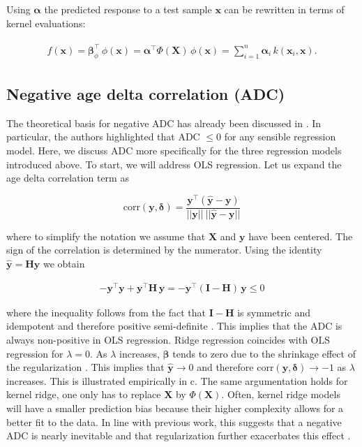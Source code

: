 \documentclass[utf8]{frontiersSCNS} %
\newcommand{\al}{\boldsymbol{\alpha}}
\renewcommand{\b}{\boldsymbol{\beta}} %
\newcommand{\corr}{\text{corr}}
\renewcommand{\d}{\boldsymbol{\delta}}
\renewcommand{\H}{\mathbf{H}}
\newcommand{\I}{\mathbf{I}}
\newcommand{\x}{\mathbf{x}}
\newcommand{\X}{\mathbf{X}}
\newcommand{\y}{\mathbf{y}}
\newcommand{\yh}{\mathbf{\hat{y}}}
\begin{document}
Using $\al$ the predicted response to a test sample $\x$ can be rewritten in terms of kernel evaluations:

\begin{align}
\begin{split}
\label{eq:kernel_ridge_apply}
f(\x) = \b_\phi^\top\, \phi(\x) = \al^\top\Phi(\X)\,\phi(\x) = \sum_{i=1}^n \al_i\, k(\x_i, \x).
\end{split}
\end{align}


\subsection{Negative age delta correlation (ADC)}\label{sec:ADC}

The theoretical basis for negative ADC has already been discussed in \cite{Le2018ABrainAGE}. In particular, the authors highlighted that ADC $\le 0$ for any sensible regression model. Here, we discuss ADC more specifically for the three regression models introduced above. To start, we will address OLS regression. Let us expand the age delta correlation term as

\begin{equation}\label{eq:correlation}
\corr(\y,\d) = \frac{\y^\top(\yh-\y)}{||\y||\ ||\yh-\y||} 
\end{equation}

where to simplify the notation we assume that $\X$ and $\y$ have been centered. The sign of the correlation is determined by the numerator. Using the identity $\yh = \H\y$ we obtain

\begin{equation}\label{eq:tmp}
\begin{split}
- \y^\top\y + \y^\top\H\,\y = -  \y^\top(\I-\H)\,\y\le 0
\end{split}
\end{equation}

where the inequality follows from the fact that  $\I-\H$ is symmetric and idempotent and therefore positive semi-definite \citep{Draper1966AppliedAnalysis}. This implies that the ADC is always non-positive in OLS regression.
Ridge regression coincides with OLS regression 
for $\lambda=0$. As  $\lambda$ increases, $\b$ tends to zero due to the shrinkage effect of the regularization \citep{Marquardt1975RidgePractice}. This implies that $\yh\rightarrow 0$ and therefore $\text{corr}(\y,\d)\rightarrow -1$ as $\lambda$ increases. This is illustrated empirically in c. The same argumentation holds for kernel ridge, one only has to replace $\X$ by $\Phi(\X)$. Often, kernel ridge models will have a smaller prediction bias because their higher complexity allows for a better fit to the data. In line with previous work, this suggests that a negative ADC is nearly inevitable and that regularization further exacerbates this effect \citep{Le2018ABrainAGE,Smith2019EstimationImaging}.
\end{document}

